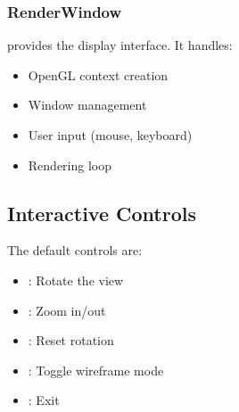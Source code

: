 \documentclass[a4paper,10pt,english,openany,oneside]{sphinxmanual}
\begin{document}
\subsubsection{RenderWindow}
\label{\detokenize{quickstart:renderwindow}}
\sphinxAtStartPar
{} provides the display interface. It handles:
\begin{itemize}
\item {} 
\sphinxAtStartPar
OpenGL context creation

\item {} 
\sphinxAtStartPar
Window management

\item {} 
\sphinxAtStartPar
User input (mouse, keyboard)

\item {} 
\sphinxAtStartPar
Rendering loop

\end{itemize}

\begin{sphinxVerbatim}[commandchars=\\\{\}]
  
               
              
          
           
\end{sphinxVerbatim}


\subsection{Interactive Controls}
\label{\detokenize{quickstart:interactive-controls}}
\sphinxAtStartPar
The default controls are:
\begin{itemize}
\item {} 
\sphinxAtStartPar
{}: Rotate the view

\item {} 
\sphinxAtStartPar
{}: Zoom in/out

\item {} 
\sphinxAtStartPar
{}: Reset rotation

\item {} 
\sphinxAtStartPar
{}: Toggle wireframe mode

\item {} 
\sphinxAtStartPar
{}: Exit

\end{itemize}
\end{document}
